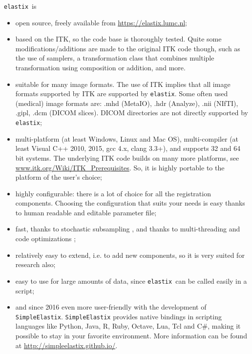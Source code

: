 \documentclass[]{report}
\newcommand{\elastix}{\texttt{elastix}}
\begin{document}
\elastix\ is
\begin{itemize}
\item open source, freely available from \url{https://elastix.lumc.nl};

\item based on the ITK, so the code base is thoroughly tested.
Quite some modifications/additions are made to the original ITK
code though, such as the use of samplers, a transformation class
that combines multiple transformation using composition or
addition, and more.

\item suitable for many image formats. The use of ITK implies that all
    image formats supported by ITK are supported by \elastix. Some often
    used (medical) image formats are: .mhd (MetaIO), .hdr (Analyze), .nii
    (NIfTI), .gipl, .dcm (DICOM slices). DICOM directories are not directly
    supported by \elastix;

\item multi-platform (at least Windows, Linux and Mac OS), multi-compiler
    (at least Visual C++ 2010, 2015, gcc 4.x, clang 3.3+), and supports
    32 and 64 bit systems. The underlying ITK code builds on many more
    platforms, see \url{www.itk.org/Wiki/ITK_Prerequisites}. So, it is
    highly portable to the platform of the user's choice;

\item highly configurable: there is a lot of choice for all the registration
components. Choosing the configuration that suits your needs is easy
thanks to human readable and editable parameter file;

\item fast, thanks to stochastic subsampling \cite{KleinEA07}, and thanks to
multi-threading and code optimizations \cite{Shamonin2014};

\item relatively easy to extend, i.e. to add new components, so it is
very suited for research also;

\item easy to use for large amounts of data, since \elastix\ can be
called easily in a script;

\item and since 2016 even more user-friendly with the development of
\texttt{SimpleElastix}. \texttt{SimpleElastix} provides native
bindings in scripting languages like Python, Java, R, Ruby, Octave,
Lua, Tcl and C\#, making it possible to stay in your favorite
environment. More information can be found at
\url{http://simpleelastix.github.io/}.

\end{itemize}
\end{document}
